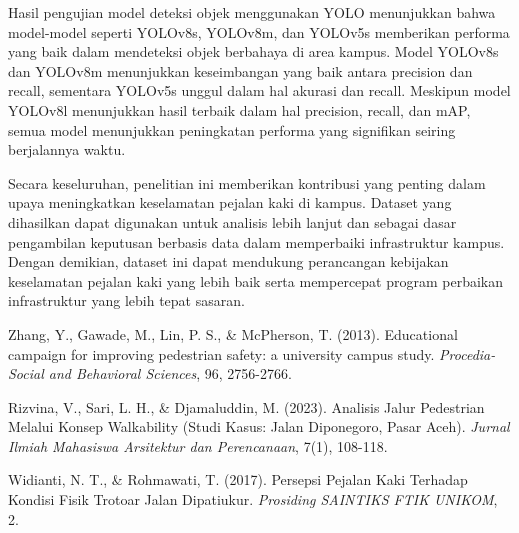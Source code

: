 \documentclass[12pt,a4paper]{article}
\begin{document}
Hasil pengujian model deteksi objek menggunakan YOLO menunjukkan bahwa model-model seperti YOLOv8s, YOLOv8m, dan YOLOv5s memberikan performa yang baik dalam mendeteksi objek berbahaya di area kampus. Model YOLOv8s dan YOLOv8m menunjukkan keseimbangan yang baik antara precision dan recall, sementara YOLOv5s unggul dalam hal akurasi dan recall. Meskipun model YOLOv8l menunjukkan hasil terbaik dalam hal precision, recall, dan mAP, semua model menunjukkan peningkatan performa yang signifikan seiring berjalannya waktu.

Secara keseluruhan, penelitian ini memberikan kontribusi yang penting dalam upaya meningkatkan keselamatan pejalan kaki di kampus. Dataset yang dihasilkan dapat digunakan untuk analisis lebih lanjut dan sebagai dasar pengambilan keputusan berbasis data dalam memperbaiki infrastruktur kampus. Dengan demikian, dataset ini dapat mendukung perancangan kebijakan keselamatan pejalan kaki yang lebih baik serta mempercepat program perbaikan infrastruktur yang lebih tepat sasaran.



\newpage


\begin{thebibliography}{3}

 Zhang, Y., Gawade, M., Lin, P. S., \& McPherson, T. (2013). Educational campaign for improving pedestrian safety: a university campus study. \textit{Procedia-Social and Behavioral Sciences}, 96, 2756-2766.

 Rizvina, V., Sari, L. H., \& Djamaluddin, M. (2023). Analisis Jalur Pedestrian Melalui Konsep Walkability (Studi Kasus: Jalan Diponegoro, Pasar Aceh). \textit{Jurnal Ilmiah Mahasiswa Arsitektur dan Perencanaan}, 7(1), 108-118.

 Widianti, N. T., \& Rohmawati, T. (2017). Persepsi Pejalan Kaki Terhadap Kondisi Fisik Trotoar Jalan Dipatiukur. \textit{Prosiding SAINTIKS FTIK UNIKOM}, 2.

\end{thebibliography}
\end{document}
